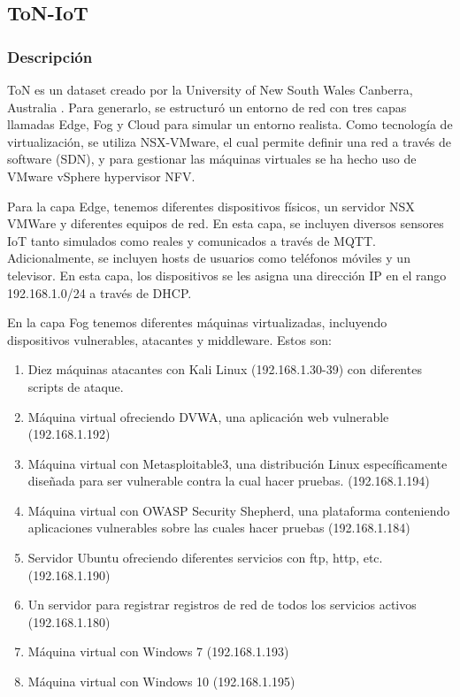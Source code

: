 \subsection{ToN-IoT}\label{toniotdatasetdescription}

\subsubsection{Descripción}

ToN es un dataset creado por la University of New South Wales Canberra, Australia \cite{9189760}. Para generarlo, se estructuró un entorno de red con tres capas llamadas Edge, Fog y Cloud para simular un entorno realista. Como tecnología de virtualización, se utiliza NSX-VMware, el cual permite definir una red a través de software (SDN), y para gestionar las máquinas virtuales se ha hecho uso de VMware vSphere hypervisor NFV.

Para la capa Edge, tenemos diferentes dispositivos físicos, un servidor NSX VMWare y diferentes equipos de red. En esta capa, se incluyen diversos sensores IoT tanto simulados como reales y comunicados a través de MQTT. Adicionalmente, se incluyen hosts de usuarios como teléfonos móviles y un televisor. En esta capa, los dispositivos se les asigna una dirección IP en el rango 192.168.1.0/24 a través de DHCP.

En la capa Fog tenemos diferentes máquinas virtualizadas, incluyendo dispositivos vulnerables, atacantes y middleware. Estos son:
\begin{enumerate}
  \item Diez máquinas atacantes con Kali Linux (192.168.1.30-39) con diferentes scripts de ataque.
  \item Máquina virtual ofreciendo DVWA, una aplicación web vulnerable (192.168.1.192)
  \item Máquina virtual con Metasploitable3, una distribución Linux específicamente diseñada para ser vulnerable contra la cual hacer pruebas. (192.168.1.194)
  \item Máquina virtual con OWASP Security Shepherd, una plataforma conteniendo aplicaciones vulnerables sobre las cuales hacer pruebas (192.168.1.184)
  \item Servidor Ubuntu ofreciendo diferentes servicios con \acrshort{ftp}, \acrshort{http}, etc. (192.168.1.190)
  \item Un servidor para registrar registros de red de todos los servicios activos (192.168.1.180)
  \item Máquina virtual con Windows 7 (192.168.1.193)
  \item Máquina virtual con Windows 10 (192.168.1.195)
\end{enumerate}

